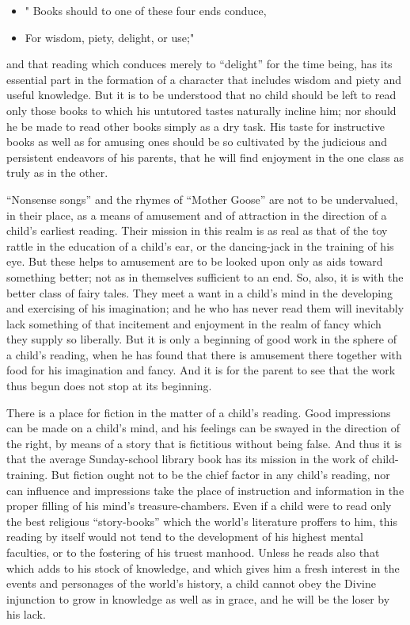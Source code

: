 \documentclass[
]{book}
\providecommand{\tightlist}{%
  \setlength{\itemsep}{0pt}\setlength{\parskip}{0pt}}
\begin{document}
\begin{itemize}
\tightlist
\item
  " Books should to one of these four ends conduce,
\item
  For wisdom, piety, delight, or use;"
\end{itemize}

and that reading which conduces merely to ``delight'' for the time being, has its essential part in the formation of a character that includes wisdom and piety and useful knowledge. But it is to be understood that no child should be left to read only those books to which his untutored tastes naturally incline him; nor should he be made to read other books simply as a dry task. His taste for instructive books as well as for amusing ones should be so cultivated by the judicious and persistent endeavors of his parents, that he will find enjoyment in the one class as truly as in the other.

``Nonsense songs'' and the rhymes of ``Mother Goose'' are not to be undervalued, in their place, as a means of amusement and of attraction in the direction of a child's earliest reading. Their mission in this realm is as real as that of the toy rattle in the education of a child's ear, or the dancing-jack in the training of his eye. But these helps to amusement are to be looked upon only as aids toward something better; not as in themselves sufficient to an end. So, also, it is with the better class of fairy tales. They meet a want in a child's mind in the developing and exercising of his imagination; and he who has never read them will inevitably lack something of that incitement and enjoyment in the realm of fancy which they supply so liberally. But it is only a beginning of good work in the sphere of a child's reading, when he has found that there is amusement there together with food for his imagination and fancy. And it is for the parent to see that the work thus begun does not stop at its beginning.

There is a place for fiction in the matter of a child's reading. Good impressions can be made on a child's mind, and his feelings can be swayed in the direction of the right, by means of a story that is fictitious without being false. And thus it is that the average Sunday-school library book has its mission in the work of child-training. But fiction ought not to be the chief factor in any child's reading, nor can influence and impressions take the place of instruction and information in the proper filling of his mind's treasure-chambers. Even if a child were to read only the best religious ``story-books'' which the world's literature proffers to him, this reading by itself would not tend to the development of his highest mental faculties, or to the fostering of his truest manhood. Unless he reads also that which adds to his stock of knowledge, and which gives him a fresh interest in the events and personages of the world's history, a child cannot obey the Divine injunction to grow in knowledge as well as in grace, and he will be the loser by his lack.
\end{document}
